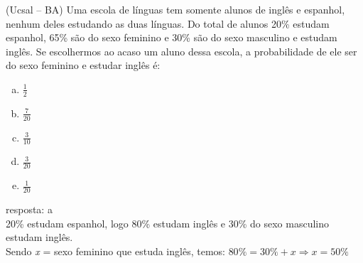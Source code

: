 \begin{ex}
 (Ucsal – BA) Uma escola de línguas tem somente alunos de inglês e espanhol, nenhum deles estudando as duas línguas. Do total de alunos 20\% estudam espanhol, 65\% são do sexo feminino e 30\% são do sexo masculino e estudam inglês. Se escolhermos ao acaso um aluno dessa escola, a probabilidade de ele ser do sexo feminino  e estudar inglês é:
   \begin{enumerate}[(a)]
   \item $\frac{1}{2}$
   \item $\frac{7}{20}$
   \item $\frac{3}{10}$
   \item $\frac{3}{20}$
   \item $\frac{1}{20}$
   \end{enumerate}
     \begin{sol}
       resposta: a \\
       20\% estudam espanhol, logo 80\% estudam inglês e 30\% do sexo masculino estudam inglês. \\
       Sendo \textit{x} = sexo feminino que estuda inglês, temos:
       $80\% = 30\% +x \Longrightarrow x= 50\%$ 
     \end{sol}
\end{ex}